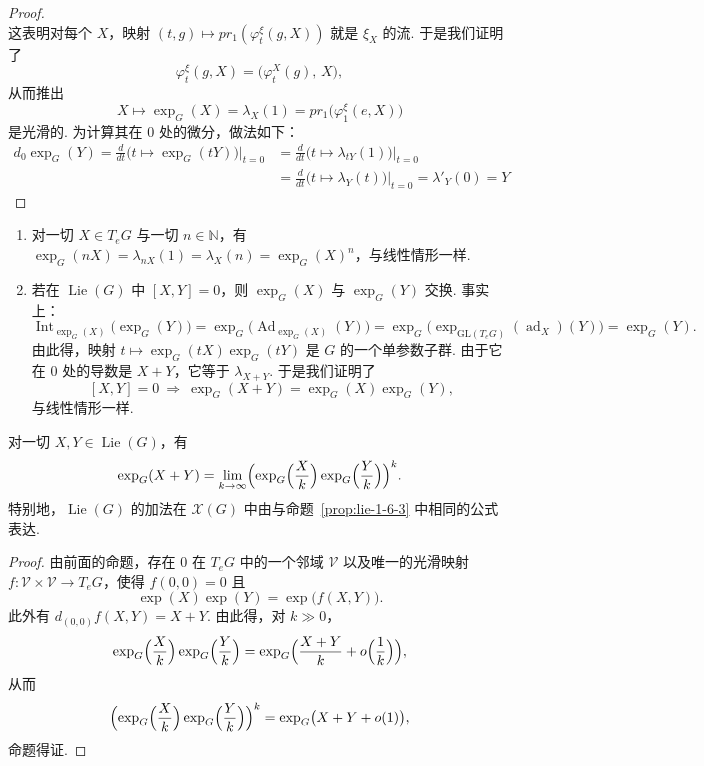 \begin{proof}
\[\]
这表明对每个 $X$，映射 $(t,g)\mapsto pr_{1}(\varphi^{\xi}_{t}(g,X))$ 就是 $\xi_{X}$ 的流. 于是我们证明了
\[
\varphi^{\xi}_{t}(g,X)=\bigl(\varphi^{X}_{t}(g),\,X\bigr),
\]
从而推出
\[
X\mapsto\exp_{G}(X)=\lambda_{X}(1)=pr_{1}\bigl(\varphi^{\xi}_{1}(e,X)\bigr)
\]
是光滑的.
为计算其在 $0$ 处的微分，做法如下：
\begin{align*}
d_{0}\exp_{G}(Y)=\frac{d}{dt}\bigl(t\mapsto\exp_{G}(tY)\bigr)|_{t=0} &= \frac{d}{dt}\bigl(t\mapsto\lambda_{tY}(1)\bigr)|_{t=0}\\
&= \frac{d}{dt}\bigl(t\mapsto\lambda_{Y}(t)\bigr)|_{t=0}=\lambda'_{Y}(0)=Y
\end{align*}
\end{proof}

\begin{remark*}
\begin{enumerate}[label=\roman*)]
\item 对一切 $X\in T_{e}G$ 与一切 $n\in\mathbb N$，有 $\exp_{G}(nX)=\lambda_{nX}(1)=\lambda_{X}(n)=\exp_{G}(X)^{n}$，与线性情形一样.
\item 若在 $\operatorname{Lie}(G)$ 中 $[X,Y]=0$，则 $\exp_{G}(X)$ 与 $\exp_{G}(Y)$ 交换. 事实上：
\[
\operatorname{Int}_{\exp_{G}(X)}\bigl(\exp_{G}(Y)\bigr)=\exp_{G}\bigl(\operatorname{Ad}_{\exp_{G}(X)}(Y)\bigr)=\exp_{G}\bigl(\exp_{\mathrm{GL}(T_{e}G)}(\operatorname{ad}_{X})(Y)\bigr)=\exp_{G}(Y).
\]
由此得，映射 $t\mapsto\exp_{G}(tX)\exp_{G}(tY)$ 是 $G$ 的一个单参数子群. 由于它在 $0$ 处的导数是 $X+Y$，它等于 $\lambda_{X+Y}$. 于是我们证明了
\[
[X,Y]=0\ \Rightarrow\ \exp_{G}(X+Y)=\exp_{G}(X)\exp_{G}(Y),
\]
与线性情形一样.
\end{enumerate}
\end{remark*}

\begin{proposition}\label{prop:lie-1-7-9}
对一切 $X,Y\in\operatorname{Lie}(G)$，有
\[
\exp_{G}(X+Y)=\lim_{k\to\infty}\Bigl(\exp_{G}\Bigl(\frac{X}{k}\Bigr)\exp_{G}\Bigl(\frac{Y}{k}\Bigr)\Bigr)^{k}.
\]
特别地，$\operatorname{Lie}(G)$ 的加法在 $\mathscr X(G)$ 中由与命题~\ref{prop:lie-1-6-3} 中相同的公式表达.
\end{proposition}

\begin{proof}
由前面的命题，存在 $0$ 在 $T_{e}G$ 中的一个邻域 $\mathcal V$ 以及唯一的光滑映射 $f:\mathcal V\times\mathcal V\longrightarrow T_{e}G$，使得 $f(0,0)=0$ 且
\[
\exp(X)\exp(Y)=\exp\bigl(f(X,Y)\bigr).
\]
此外有 $d_{(0,0)}f(X,Y)=X+Y$. 由此得，对 $k\gg 0$，
\[
\exp_{G}\Bigl(\frac{X}{k}\Bigr)\exp_{G}\Bigl(\frac{Y}{k}\Bigr)=\exp_{G}\Bigl(\frac{X+Y}{k}+o\Bigl(\frac{1}{k}\Bigr)\Bigr),
\]
从而
\[
\Bigl(\exp_{G}\Bigl(\frac{X}{k}\Bigr)\exp_{G}\Bigl(\frac{Y}{k}\Bigr)\Bigr)^{k}=\exp_{G}\bigl(X+Y+o(1)\bigr),
\]
命题得证.
\end{proof}

